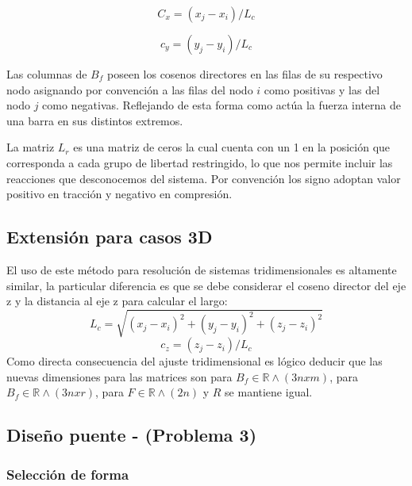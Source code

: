 \documentclass[]{article}
\begin{document}
	\begin{equation}
		C_x = (x_j - x_i)/L_c
	\end{equation}
	 
	\begin{equation}
		c_y = (y_j - y_i)/L_c
	\end{equation}
	
	Las columnas de $B_f$ poseen los cosenos directores en las filas de su respectivo nodo asignando por convención a las filas del nodo $i$ como positivas y las del nodo $j$ como negativas. Reflejando de esta forma como actúa la fuerza interna de una barra en sus distintos extremos.
	
	La matriz $L_r$ es una matriz de ceros la cual cuenta con un 1 en la posición que corresponda a cada grupo de libertad restringido, lo que nos permite incluir las reacciones que desconocemos del sistema. Por convención los signo adoptan valor positivo en tracción y negativo en compresión.
	
	\subsection{Extensión para casos 3D}
	El uso de este método para resolución de sistemas tridimensionales es altamente similar, la particular diferencia es que se debe considerar el coseno director del eje z y la distancia al eje z para calcular el largo:
	\begin{equation}
		L_c = \sqrt{(x_j - x_i)^2 + (y_j - y_i)^2 + (z_j - z_i)^2}
	\end{equation}
	\begin{equation}
		c_z = (z_j - z_i)/L_c
	\end{equation}
	Como directa consecuencia del ajuste tridimensional es lógico deducir que las nuevas dimensiones para las matrices son para  $B_f \in \mathbb{R} \land (3n x m)$, para  $B_f \in \mathbb{R} \land (3n x r)$, para $F\in \mathbb{R} \land (2n)$ y $R$ se mantiene igual.
	
	\subsection{Diseño puente - (Problema 3)}
	\subsubsection{Selección de forma}
	
\end{document}
